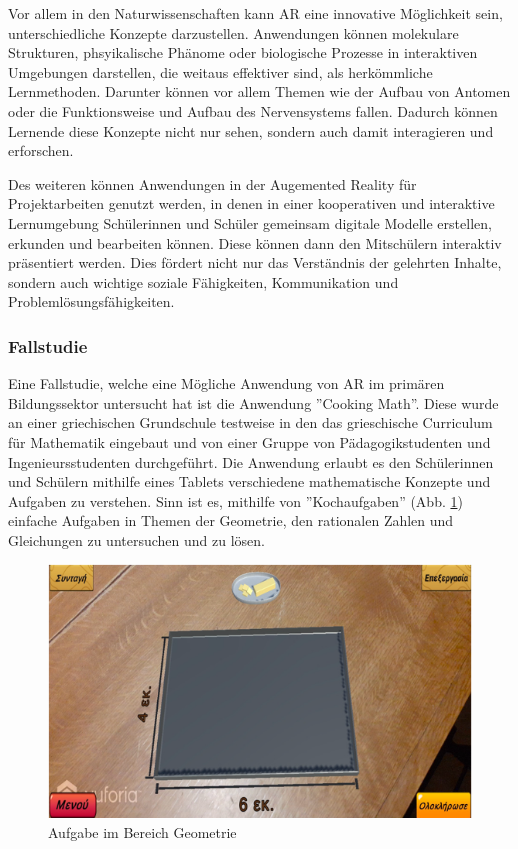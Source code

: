 \documentclass[conference]{IEEEtran}
\begin{document}
Vor allem in den Naturwissenschaften kann AR eine innovative Möglichkeit sein, unterschiedliche Konzepte darzustellen.
Anwendungen können molekulare Strukturen, phsyikalische Phänome oder biologische Prozesse in interaktiven Umgebungen 
darstellen, die weitaus effektiver sind, als herkömmliche Lernmethoden. Darunter können vor allem Themen wie der Aufbau
von Antomen oder die Funktionsweise und Aufbau des Nervensystems fallen. Dadurch können Lernende diese Konzepte nicht nur sehen,
sondern auch damit interagieren und erforschen.\cite{b6}

Des weiteren können Anwendungen in der Augemented Reality für Projektarbeiten genutzt werden, in denen in einer kooperativen
und interaktive Lernumgebung Schülerinnen und Schüler gemeinsam digitale Modelle erstellen, erkunden und bearbeiten können.
Diese können dann den Mitschülern interaktiv präsentiert werden. Dies fördert nicht nur das Verständnis der gelehrten Inhalte,
sondern auch wichtige soziale Fähigkeiten, Kommunikation und Problemlösungsfähigkeiten.

\subsubsection*{Fallstudie}
Eine Fallstudie, welche eine Mögliche Anwendung von AR im primären Bildungssektor untersucht hat ist die Anwendung ''Cooking Math''.
Diese wurde an einer griechischen Grundschule testweise in den das grieschische Curriculum für Mathematik eingebaut und von einer Gruppe von
Pädagogikstudenten und Ingenieursstudenten durchgeführt.
Die Anwendung erlaubt es den Schülerinnen und Schülern mithilfe eines Tablets verschiedene mathematische Konzepte und Aufgaben zu
verstehen. Sinn ist es, mithilfe von ''Kochaufgaben'' (Abb. \ref{fig3}) einfache Aufgaben in Themen der Geometrie, den rationalen Zahlen und Gleichungen
zu untersuchen und zu lösen.

\begin{figure}[htbp]
    \centerline{\includegraphics[scale=0.7]{img/geometrie.png}}
    \caption{Aufgabe im Bereich Geometrie}
    \label{fig3}
\end{figure}
\end{document}
